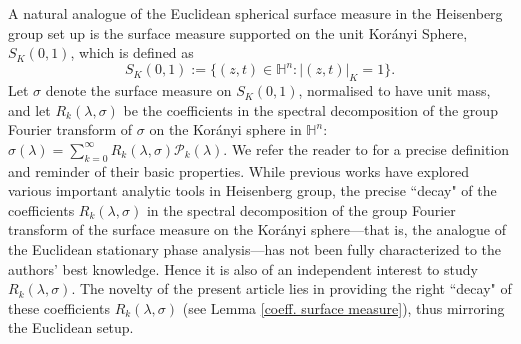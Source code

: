\documentclass[11pt, reqno]{amsart}
\theoremstyle{plain}
\theoremstyle{remark}
\theoremstyle{example}
\theoremstyle{definition}
\numberwithin{equation}{section}
\def\H{\mathbb{H}}
\def\Ha{\mathbb{H}^n}
\begin{document}
A natural analogue of the Euclidean spherical surface measure in the Heisenberg group set up is the surface measure supported on the unit Kor\'anyi Sphere, $S_K(0,1)$, which is defined as 
 \begin{equation}
 S_K(0,1):=\lbrace(z,t) \in \H^n : |(z,t)|_K=1 \rbrace.
 \end{equation}
Let $\sigma$ denote the surface measure on $S_K(0,1)$, normalised to have unit mass, and let $R_{k}(\lambda, \sigma)$ be the coefficients in the spectral decomposition of the group Fourier transform of  $\sigma$ on the Kor\'anyi sphere in $\Ha$: $\hat{\sigma}(\lambda)= \sum_{k=0}^{\infty}  R_{k}(\lambda, \sigma)  \mathcal{P}_{k}(\lambda)$. We refer the reader to  for a precise definition and reminder of their basic properties. While previous works have explored various important analytic tools in Heisenberg group, the precise ``decay" of the coefficients $R_k(\lambda,\sigma)$ in the spectral decomposition of the group Fourier transform of the surface measure on the Korányi sphere—that is, the analogue of the Euclidean stationary phase analysis—has not been fully characterized to the authors' best knowledge. Hence it is also of an independent interest to study $R_k(\lambda, \sigma)$. The novelty of the present article lies in providing the right ``decay" of these coefficients $R_{k}(\lambda, \sigma)$ (see Lemma \ref{coeff. surface measure}), thus mirroring the Euclidean setup.
\end{document}
